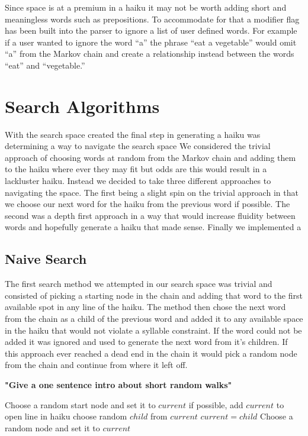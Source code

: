 \documentclass[]{article}
\newcommand{\comment}[1]
{\par {\bfseries \color{green} #1 \par}}
\begin{document}
Since space is at a premium in a haiku it may not be worth adding short and meaningless words such as prepositions. To accommodate for that a modifier flag has been built into the parser to ignore a list of user defined words. For example if a user wanted to ignore the word ``a'' the phrase ``eat a vegetable'' would omit ``a'' from the Markov chain and create a relationship instead between the words ``eat'' and ``vegetable.''

\section{Search Algorithms}
With the search space created the final step in generating a haiku was determining a way to navigate the search space We considered the trivial approach of choosing words at random from the Markov chain and adding them to the haiku where ever they may fit but odds are this would result in a lackluster haiku. Instead we decided to take three different approaches to navigating the space. The first being a slight spin on the trivial approach in that we choose our next word for the haiku from the previous word if possible. The second was a depth first approach in a way that would increase fluidity between words and hopefully generate a haiku that made sense. Finally we implemented a 

\subsection{Naive Search}
The first search method we attempted in our search space was trivial and consisted of picking a starting node in the chain and adding that word to the first available spot in any line of the haiku. The method then chose the next word from the chain as a child of the previous word and added it to any available space in the haiku that would not violate a syllable constraint. If the word could not be added it was ignored and used to generate the next word from it's children. If this approach ever reached a dead end in the chain it would pick a random node from the chain and continue from where it left off.\comment{"Give a one sentence intro about short random walks"}

\begin{algorithm}[H]
	\caption{$Naive\_Search()$} \label{Naive}
	\begin{algorithmic}[1]
		\State Choose a random start node and set it to $current$
			\State if possible, add $current$ to open line in haiku
				\State choose random $child$ from $current$
				\State $current = child$
			\Else
				\State Choose a random node and set it to $current$
			\EndIf
		\EndWhile
	\end{algorithmic}
\end{algorithm}
\end{document}
